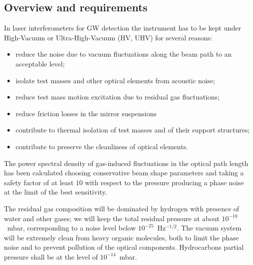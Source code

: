 \subsection{Overview and requirements}
\label{Sec:Vacuum:Intro}
In laser interferometers for GW detection the instrument has to be kept under High-Vacuum or Ultra-High-Vacuum (HV, UHV) for several reasons: 
\begin{itemize} 
\item reduce the noise due to vacuum fluctuations along the beam path to an acceptable level; 
\item isolate test masses and other optical elements from acoustic noise; 
\item reduce test mass motion excitation due to residual gas fluctuations;
\item reduce friction losses in the mirror suspensions 
\item contribute to thermal isolation of test masses and of their support structures; 
\item contribute to preserve the cleanliness of optical elements. 
\end{itemize} 
The power spectral density of gas-induced fluctuations in the optical path length has been calculated choosing conservative beam shape parameters and taking a safety factor of at least $10$ with respect to the pressure producing a phase noise at the limit of the best sensitivity.

The residual gas composition will be dominated by hydrogen with presence of water and other gases; we will keep the total residual pressure at about $10^{-10}$~mbar, corresponding to a noise level below $10^{-25}$~Hz$^{-1/2}$.
The vacuum system will be extremely clean from heavy organic molecules, both to limit the phase noise and to prevent pollution of the optical components. Hydrocarbons partial pressure shall be at the level of $10^{-14}$~mbar.


